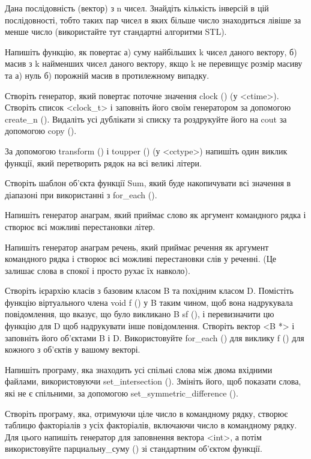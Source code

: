 \documentclass[]{article}
\begin{document}
\begin{enumerate}
Дана послідовність (вектор) з n чисел. Знайдіть кількість інверсій в цій
послідовності, тобто таких пар чисел в яких більше число знаходиться
лівіше за менше число (використайте тут стандартні алгоритми STL).

\protect\hypertarget{_Hlk65952552}{}{}Напишіть функцію, як повертає а)
суму найбільших k чисел даного вектору, б) масив з k найменших чисел
даного вектору, якщо k не перевищує розмір масиву та а) нуль б) порожній
масив в протилежному випадку.

Створіть генератор, який повертає поточне значення clock () (у
\textless{}ctime\textgreater{}). Створіть список
\textless{}clock\_t\textgreater{} і заповніть його своїм генератором за
допомогою create\_n (). Видаліть усі дублікати зі списку та роздрукуйте
його на cout за допомогою copy ().

За допомогою transform () і toupper () (у
\textless{}cctype\textgreater{}) напишіть один виклик функції, який
перетворить рядок на всі великі літери.

Створіть шаблон об'єкта функції Sum, який буде накопичувати всі значення
в діапазоні при використанні з for\_each ().

Напишіть генератор анаграм, який приймає слово як аргумент командного
рядка і створює всі можливі перестановки літер.

Напишіть генератор анаграм речень, який приймає речення як аргумент
командного рядка і створює всі можливі перестановки слів у реченні. (Це
залишає слова в спокої і просто рухає їх навколо).

\protect\hypertarget{_Hlk65952580}{}{}

Створіть ієрархію класів з базовим класом B та похідним класом D.
Помістіть функцію віртуального члена void f () у B таким чином, щоб вона
надрукувала повідомлення, що вказує, що було викликано B sf (), і
перевизначити цю функцію для D щоб надрукувати інше повідомлення.
Створіть вектор \textless{}B *\textgreater{} і заповніть його об'єктами
B і D. Використовуйте for\_each () для виклику f () для кожного з
об'єктів у вашому векторі.

Напишіть програму, яка знаходить усі спільні слова між двома вхідними
файлами, використовуючи set\_intersection (). Змініть його, щоб показати
слова, які не є спільними, за допомогою set\_symmetric\_difference ().

Створіть програму, яка, отримуючи ціле число в командному рядку, створює
таблицю факторіалів з усіх факторіалів, включаючи число в командному
рядку. Для цього напишіть генератор для заповнення вектора
\textless{}int\textgreater{}, а потім використовуйте парциальну\_суму ()
зі стандартним об'єктом функції.


\end{enumerate}
\end{document}
